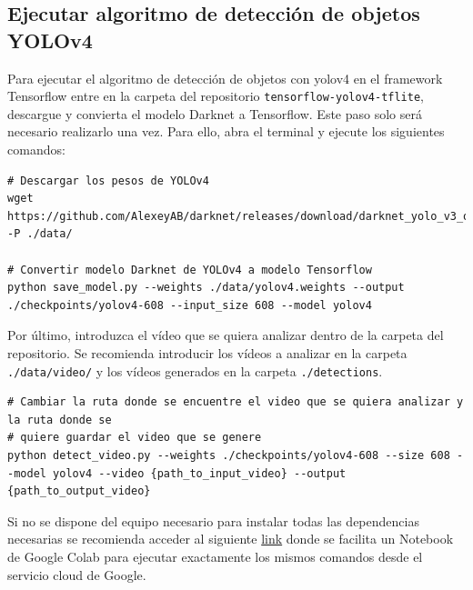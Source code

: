 \subsection{Ejecutar algoritmo de detección de objetos YOLOv4}
\label{subsec:ejecutar-deteccion-yolov4}

Para ejecutar el algoritmo de detección de objetos con \gls{yolov4} en el framework Tensorflow entre en la carpeta del repositorio \texttt{tensorflow-yolov4-tflite}, descargue y convierta el modelo Darknet a Tensorflow. Este paso solo será necesario realizarlo una vez. Para ello, abra el terminal y ejecute los siguientes comandos:

\vspace{0.5cm}
\begin{lstlisting}[language=iPython,caption=Descarga de pesos y conversion modelo YOLOv4,captionpos=b,label={lst:descarga-weights-convertir-modelo}]
# Descargar los pesos de YOLOv4
wget https://github.com/AlexeyAB/darknet/releases/download/darknet_yolo_v3_optimal/yolov4.weights -P ./data/

# Convertir modelo Darknet de YOLOv4 a modelo Tensorflow
python save_model.py --weights ./data/yolov4.weights --output ./checkpoints/yolov4-608 --input_size 608 --model yolov4
\end{lstlisting}

Por último, introduzca el vídeo que se quiera analizar dentro de la carpeta del repositorio. Se recomienda introducir los vídeos a analizar en la carpeta \texttt{./data/video/} y los vídeos generados en la carpeta \texttt{./detections}.

\vspace{0.5cm}
\begin{lstlisting}[language=iPython,caption=Ejecutar script detección de objetos con YOLOv4 en Tensorflow,captionpos=b,label={lst:ejecutar-yolov4-tf}]
# Cambiar la ruta donde se encuentre el video que se quiera analizar y la ruta donde se
# quiere guardar el video que se genere
python detect_video.py --weights ./checkpoints/yolov4-608 --size 608 --model yolov4 --video {path_to_input_video} --output {path_to_output_video}
\end{lstlisting}

Si no se dispone del equipo necesario para instalar todas las dependencias necesarias se recomienda acceder al siguiente \href{https://colab.research.google.com/drive/1ZwcfV2hFZKcsyXaqKp9AGuEi5TY-QwVW?usp=sharing}{link} donde se facilita un Notebook de Google Colab para ejecutar exactamente los mismos comandos desde el servicio cloud de Google.

